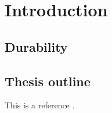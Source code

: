 \chapter{Introduction}

\section{Durability}

\section{Thesis outline}

This is a reference \citep{article01}.
